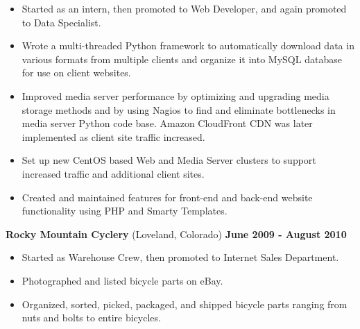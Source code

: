 \documentclass[a4paper,10pt]{article}
\begin{document}
        \begin{itemize}
            \item Started as an intern, then promoted to Web Developer, and again promoted to Data Specialist.
            \item Wrote a multi-threaded Python framework to automatically download data in various formats from multiple clients and organize it into MySQL database for use on client websites.
            \item Improved media server performance by optimizing and upgrading media storage methods and by using Nagios to find and eliminate bottlenecks in media server Python code base. Amazon CloudFront CDN was later implemented as client site traffic increased.
            \item Set up new CentOS based Web and Media Server clusters to support increased traffic and additional client sites.
            \item Created and maintained features for front-end and back-end website functionality using PHP and Smarty Templates.
        \end{itemize}
        \vspace*{2ex}
        \textbf{Rocky Mountain Cyclery} (Loveland, Colorado) \hfill \textbf{June 2009 - August 2010}
        \begin{itemize}
            \item Started as Warehouse Crew, then promoted to Internet Sales Department.
            \item Photographed and listed bicycle parts on eBay.
            \item Organized, sorted, picked, packaged, and shipped bicycle parts ranging from nuts and bolts to entire bicycles.
        \end{itemize}
\end{document}
